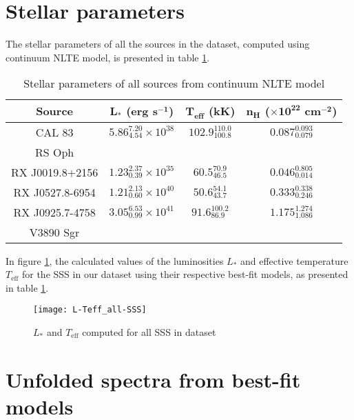 	\section{Stellar parameters}
		The stellar parameters of all the sources in the dataset, computed using continuum NLTE model, is presented in table \ref{tab:sss-stellar-params}.
		\renewcommand{\arraystretch}{1.8}
		\begin{table}[!htb]
			\centering
			\caption{Stellar parameters of all sources from continuum NLTE model}
			\label{tab:sss-stellar-params}
			\begin{tabular}{cccc}
			\hline
			{\textbf{Source}} & {$\boldsymbol{L_*}$ \textbf{(erg s$\boldsymbol{^{-1}}$)}} & {\textbf{$\boldsymbol{T_\text{eff}}$ (kK)}} & {\textbf{$\boldsymbol{n_H}$ ($\boldsymbol{\times 10^{22}}$ cm$\boldsymbol{^{-2}}$)}} \\
			\hline
			{CAL 83} & {$5.86_{4.54}^{7.20}\times 10^{38}$} & {$102.9_{100.8}^{110.0}$} & {$0.087_{0.079}^{0.093}$} \\
			{RS Oph} & {} & {} & {} \\
			{RX J0019.8+2156} & {$1.23_{0.39}^{2.37}\times 10^{35}$} & {$60.5_{46.5}^{70.9}$} & {$0.046_{0.014}^{0.805}$} \\
			{RX J0527.8-6954} & {$1.21_{0.60}^{2.13}\times 10^{40}$} & {$50.6_{43.7}^{54.1}$} & {$0.333_{0.246}^{0.338}$} \\
			{RX J0925.7-4758} & {$3.05_{0.99}^{6.53}\times 10^{41}$} & {$91.6_{86.9}^{100.2}$} & {$1.175_{1.086}^{1.274}$} \\
			{V3890 Sgr} & {} & {} & {} \\
			\hline
			\end{tabular}
		\end{table}
		\renewcommand{\arraystretch}{2.2}
		
		In figure \ref{result:L-Teff-SSS}, the calculated values of the luminosities $L_*$ and effective temperature $T_\text{eff}$ for the SSS in our dataset using their respective best-fit models, as presented in table \ref{tab:sss-stellar-params}.
		\begin{figure}[h!]
			\centering
			\texttt{[image: L-Teff\_all-SSS]}
			\caption{$L_*$ and $T_\text{eff}$ computed for all SSS in dataset}
			\label{result:L-Teff-SSS}
		\end{figure}
	
	\section{Unfolded spectra from best-fit models}
	
